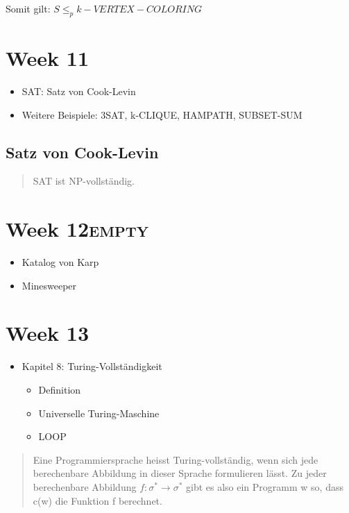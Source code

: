 \documentclass[11pt,twoside,landscape]{article}
\begin{document}
\begin{multicols}{3}
Somit gilt: \(S \leq_p k-VERTEX-COLORING\)

\section{Week 11}
\label{sec:org2ce08f7}
\begin{itemize}
\item SAT: Satz von Cook-Levin
\item Weitere Beispiele: 3SAT, k-CLIQUE, HAMPATH, SUBSET-SUM
\end{itemize}


\subsection{Satz von Cook-Levin}
\label{sec:org3f0bef8}
\begin{quote}
SAT ist NP-vollständig.
\end{quote}

\section{Week 12\hfill{}\textsc{empty}}
\label{sec:orge3d2410}
\begin{itemize}
\item Katalog von Karp
\item Minesweeper
\end{itemize}

\section{Week 13}
\label{sec:org63ab070}
\begin{itemize}
\item Kapitel 8: Turing-Vollständigkeit
\begin{itemize}
\item Definition
\item Universelle Turing-Maschine
\item LOOP
\end{itemize}
\end{itemize}

\begin{quote}
Eine Programmiersprache heisst Turing-vollständig, wenn sich jede berechenbare Abbildung in dieser Sprache formulieren lässt. Zu jeder berechenbare Abbildung \(f: \sigma^*  \rightarrow \sigma^*\) gibt es also ein Programm w so, dass c(w) die Funktion f berechnet.
\end{quote}


\end{multicols}
\end{document}
